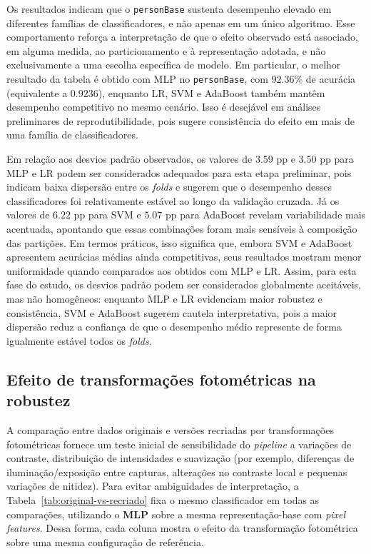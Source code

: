 \documentclass[12pt,a4paper]{article}
\begin{document}
Os resultados indicam que o \texttt{personBase} sustenta desempenho elevado em diferentes famílias de classificadores, e não apenas em um único algoritmo. Esse comportamento reforça a interpretação de que o efeito observado está associado, em alguma medida, ao particionamento e à representação adotada, e não exclusivamente a uma escolha específica de modelo. Em particular, o melhor resultado da tabela é obtido com MLP no \texttt{personBase}, com \(92.36\%\) de acurácia (equivalente a \(0.9236\)), enquanto LR, SVM e AdaBoost também mantêm desempenho competitivo no mesmo cenário. Isso é desejável em análises preliminares de reprodutibilidade, pois sugere consistência do efeito em mais de uma família de classificadores.

Em relação aos desvios padrão observados, os valores de \(3.59\) pp e \(3.50\) pp para MLP e LR podem ser considerados adequados para esta etapa preliminar, pois indicam baixa dispersão entre os \textit{folds} e sugerem que o desempenho desses classificadores foi relativamente estável ao longo da validação cruzada. Já os valores de \(6.22\) pp para SVM e \(5.07\) pp para AdaBoost revelam variabilidade mais acentuada, apontando que essas combinações foram mais sensíveis à composição das partições. Em termos práticos, isso significa que, embora SVM e AdaBoost apresentem acurácias médias ainda competitivas, seus resultados mostram menor uniformidade quando comparados aos obtidos com MLP e LR. Assim, para esta fase do estudo, os desvios padrão podem ser considerados globalmente aceitáveis, mas não homogêneos: enquanto MLP e LR evidenciam maior robustez e consistência, SVM e AdaBoost sugerem cautela interpretativa, pois a maior dispersão reduz a confiança de que o desempenho médio represente de forma igualmente estável todos os \textit{folds}.


\subsection{Efeito de transformações fotométricas na robustez}
A comparação entre dados originais e versões recriadas por transformações fotométricas fornece um teste inicial de sensibilidade do \textit{pipeline} a variações de contraste, distribuição de intensidades e suavização (por exemplo, diferenças de iluminação/exposição entre capturas, alterações no contraste local e pequenas variações de nitidez). Para evitar ambiguidades de interpretação, a Tabela~\ref{tab:original-vs-recriado} fixa o mesmo classificador em todas as comparações, utilizando o \textbf{MLP} sobre a mesma representação-base com \textit{pixel features}. Dessa forma, cada coluna mostra o efeito da transformação fotométrica sobre uma mesma configuração de referência.
\end{document}
